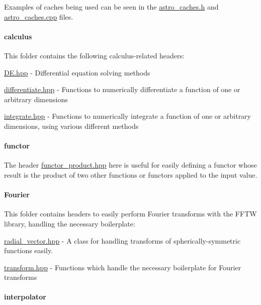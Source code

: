 Examples of caches being used can be seen in the \hyperlink{astro__caches_8h}{astro\+\_\+caches.\+h} and \hyperlink{astro__caches_8cpp}{astro\+\_\+caches.\+cpp} files.

\paragraph*{calculus}

This folder contains the following calculus-\/related headers\+:


\begin{DoxyItemize}
\item \hyperlink{DE_8hpp}{D\+E.\+hpp} -\/ Differential equation solving methods
\item \hyperlink{differentiate_8hpp}{differentiate.\+hpp} -\/ Functions to numerically differentiate a function of one or arbitrary dimensions
\item \hyperlink{integrate_8hpp}{integrate.\+hpp} -\/ Functions to numerically integrate a function of one or arbitrary dimensions, using various different methods
\end{DoxyItemize}

\paragraph*{functor}

The header \hyperlink{functor__product_8hpp}{functor\+\_\+product.\+hpp} here is useful for easily defining a functor whose result is the product of two other functions or functors applied to the input value.

\paragraph*{Fourier}

This folder contains headers to easily perform Fourier transforms with the F\+F\+T\+W library, handling the necessary boilerplate\+:


\begin{DoxyItemize}
\item \hyperlink{radial__vector_8hpp}{radial\+\_\+vector.\+hpp} -\/ A class for handling transforms of spherically-\/symmetric functions easily.
\item \hyperlink{transform_8hpp}{transform.\+hpp} -\/ Functions which handle the necessary boilerplate for Fourier transforms
\end{DoxyItemize}

\paragraph*{interpolator}

